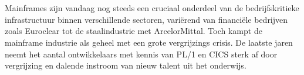 
%
%
%
%
%

%



\chapter*{}

Mainframes zijn vandaag nog steeds een cruciaal onderdeel van de bedrijfskritieke infrastructuur binnen verschillende sectoren, 
variërend van financiële bedrijven zoals Euroclear tot de staalindustrie met ArcelorMittal.
Toch kampt de mainframe industrie als geheel met een grote vergrijzings crisis.
De laatste jaren neemt het aantal ontwikkelaars met kennis van PL/1 en CICS sterk af door vergrijzing en dalende instroom van nieuw talent uit het onderwijs.

